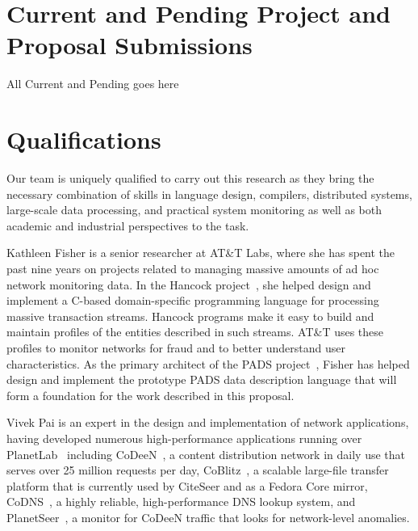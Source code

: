 \documentclass[12pt]{article}
\begin{document}
\newpage
\section{Current and Pending Project and Proposal Submissions}

All Current and Pending goes here



\newpage
\section{Qualifications}

Our team is uniquely qualified to carry out this research as they
bring the necessary combination of skills in language design,
compilers, distributed systems, large-scale data processing, and
practical system monitoring as well as both academic and industrial
perspectives to the task.  

Kathleen Fisher is a senior researcher at AT\&T Labs,
where she has spent the past nine years on projects
related to managing massive amounts of ad hoc network monitoring data.
In the Hancock project~\cite{kdd00,hancock-toplas}, she helped 
design and implement a C-based
domain-specific programming language for processing massive  
transaction streams.  Hancock programs make it easy to build
and maintain profiles of the entities described in such streams. 
AT\&T uses these profiles to monitor networks for fraud 
and to better understand user characteristics.
As the primary architect of the PADS project~\cite{fisher+:pads}, 
Fisher has helped design and implement the prototype PADS
data description language that will form a foundation for the work
described in this proposal.  

Vivek Pai is an expert in the
design and implementation of network applications, having developed
numerous high-performance applications running over
PlanetLab~\cite{planetlab} including CoDeeN~\cite{codeen}, a content
distribution network in daily use that serves over 25 million
requests per day, CoBlitz~\cite{coblitz}, a scalable large-file
transfer platform that is currently used by CiteSeer and as
a Fedora Core mirror, CoDNS~\cite{codns}, a highly reliable,
high-performance DNS lookup system, and PlanetSeer~\cite{planetseer},
a monitor for CoDeeN traffic that looks for network-level anomalies.
\end{document}
